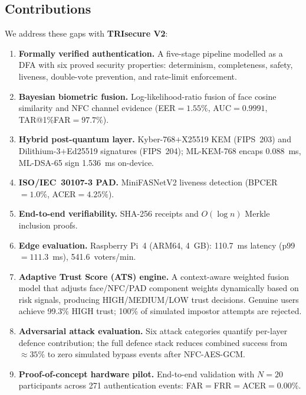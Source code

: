 \documentclass[submission]{sacjsub}
\begin{document}
\subsection*{Contributions}

We address these gaps with \textbf{TRIsecure V2}:

\begin{enumerate}[label=\textbf{C\arabic*.},leftmargin=*]
  \item \textbf{Formally verified authentication.} A five-stage
        pipeline modelled as a DFA with six proved security properties:
        determinism, completeness, safety, liveness, double-vote
        prevention, and rate-limit enforcement.
  \item \textbf{Bayesian biometric fusion.} Log-likelihood-ratio
        fusion of face cosine similarity and NFC channel evidence
        (EER\(=1.55\%\), AUC\(=0.9991\), TAR@1\%FAR\(=97.7\%\)).
  \item \textbf{Hybrid post-quantum layer.} Kyber-768\(+\)X25519 KEM
        (FIPS~203) and Dilithium-3\(+\)Ed25519 signatures (FIPS~204);
        ML-KEM-768 encaps 0.088~ms, ML-DSA-65 sign 1.536~ms on-device.
  \item \textbf{ISO/IEC~30107-3 PAD.} MiniFASNetV2 liveness
        detection (BPCER\(=1.0\%\), ACER\(=4.25\%\)).
  \item \textbf{End-to-end verifiability.} SHA-256 receipts and
        \(O(\log n)\) Merkle inclusion proofs.
  \item \textbf{Edge evaluation.} Raspberry Pi~4 (ARM64, 4~GB):
        110.7~ms latency (p99\(=111.3\)~ms), 541.6~voters/min.
  \item \textbf{Adaptive Trust Score (ATS) engine.} A context-aware
        weighted fusion model that adjusts face/NFC/PAD component
        weights dynamically based on risk signals, producing
        HIGH/MEDIUM/LOW trust decisions. Genuine users achieve 99.3\%
        HIGH trust; 100\% of simulated impostor attempts are rejected.
  \item \textbf{Adversarial attack evaluation.} Six attack categories
        quantify per-layer defence contribution; the full defence stack
        reduces combined success from \(\approx35\%\) to zero simulated
        bypass events after NFC-AES-GCM.
  \item \textbf{Proof-of-concept hardware pilot.} End-to-end
        validation with \(N{=}20\) participants across 271
        authentication events: FAR\(=\)FRR\(=\)ACER\(=0.00\%\).
\end{enumerate}
\end{document}
